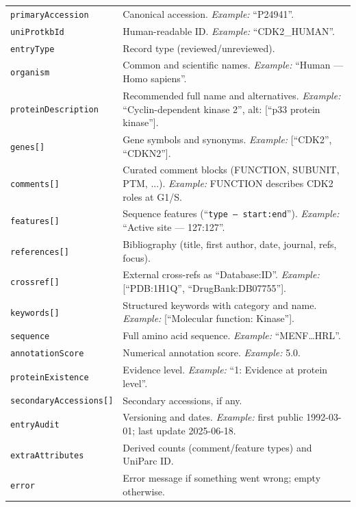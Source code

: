 \documentclass{article}
\begin{document}
\begin{table}[!htbp]
\begin{center}
\begin{tabularx}{\textwidth}{p{5.5cm}X}
\texttt{primaryAccession} & Canonical accession. \emph{Example:} “P24941”. \\
\addlinespace
\texttt{uniProtkbId} & Human-readable ID. \emph{Example:} “CDK2\_HUMAN”. \\
\addlinespace
\texttt{entryType} & Record type (reviewed/unreviewed). \\
\addlinespace
\texttt{organism} & Common and scientific names. \emph{Example:} “Human — Homo sapiens”. \\
\addlinespace
\texttt{proteinDescription} & Recommended full name and alternatives. \emph{Example:} “Cyclin-dependent kinase 2”, alt: [“p33 protein kinase”]. \\
\addlinespace
\texttt{genes[]} & Gene symbols and synonyms. \emph{Example:} [“CDK2”, “CDKN2”]. \\
\addlinespace
\texttt{comments[]} & Curated comment blocks (FUNCTION, SUBUNIT, PTM, ...). \emph{Example:} FUNCTION describes CDK2 roles at G1/S. \\
\addlinespace
\texttt{features[]} & Sequence features (“\texttt{type — start:end}”). \emph{Example:} “Active site — 127:127”. \\
\addlinespace
\texttt{references[]} & Bibliography (title, first author, date, journal, refs, focus). \\
\addlinespace
\texttt{crossref[]} & External cross-refs as “Database:ID”. \emph{Example:} [“PDB:1H1Q”, “DrugBank:DB07755”]. \\
\addlinespace
\texttt{keywords[]} & Structured keywords with category and name. \emph{Example:} [“Molecular function: Kinase”]. \\
\addlinespace
\texttt{sequence} & Full amino acid sequence. \emph{Example:} “MENF…HRL”. \\
\addlinespace
\texttt{annotationScore} & Numerical annotation score. \emph{Example:} 5.0. \\
\addlinespace
\texttt{proteinExistence} & Evidence level. \emph{Example:} “1: Evidence at protein level”. \\
\addlinespace
\texttt{secondaryAccessions[]} & Secondary accessions, if any. \\
\addlinespace
\texttt{entryAudit} & Versioning and dates. \emph{Example:} first public 1992-03-01; last update 2025-06-18. \\
\addlinespace
\texttt{extraAttributes} & Derived counts (comment/feature types) and UniParc ID. \\
\addlinespace
\texttt{error} & Error message if something went wrong; empty otherwise. \\
\bottomrule
\end{tabularx}
\end{center}
\end{table}
\end{document}
